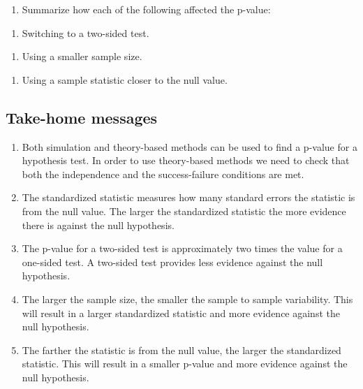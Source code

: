 \documentclass[
]{report}
\providecommand{\tightlist}{%
  \setlength{\itemsep}{0pt}\setlength{\parskip}{0pt}}
\begin{document}
\vspace{0.3in}

\begin{enumerate}
\def\labelenumi{\arabic{enumi}.}
\setcounter{enumi}{20}
\tightlist
\item
  Summarize how each of the following affected the p-value:
\end{enumerate}

\begin{enumerate}
\def\labelenumi{\alph{enumi})}
\tightlist
\item
  Switching to a two-sided test.
\end{enumerate}

\vspace{0.4in}

\begin{enumerate}
\def\labelenumi{\alph{enumi})}
\setcounter{enumi}{1}
\tightlist
\item
  Using a smaller sample size.
\end{enumerate}

\vspace{0.4in}

\begin{enumerate}
\def\labelenumi{\alph{enumi})}
\setcounter{enumi}{2}
\tightlist
\item
  Using a sample statistic closer to the null value.
\end{enumerate}

\vspace{0.4in}

\subsection{Take-home messages}\label{take-home-messages-8}

\begin{enumerate}
\def\labelenumi{\arabic{enumi}.}
\item
  Both simulation and theory-based methods can be used to find a p-value for a hypothesis test. In order to use theory-based methods we need to check that both the independence and the success-failure conditions are met.
\item
  The standardized statistic measures how many standard errors the statistic is from the null value. The larger the standardized statistic the more evidence there is against the null hypothesis.
\item
  The p-value for a two-sided test is approximately two times the value for a one-sided test. A two-sided test provides less evidence against the null hypothesis.
\item
  The larger the sample size, the smaller the sample to sample variability. This will result in a larger standardized statistic and more evidence against the null hypothesis.
\item
  The farther the statistic is from the null value, the larger the standardized statistic. This will result in a smaller p-value and more evidence against the null hypothesis.
\end{enumerate}
\end{document}
